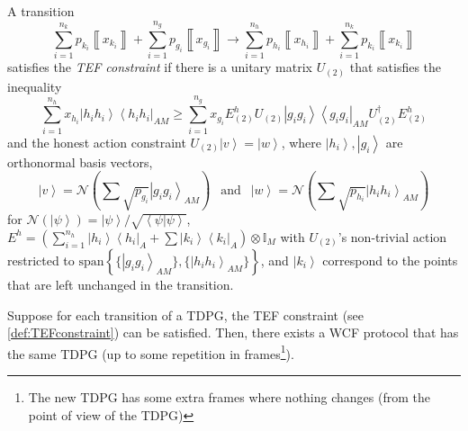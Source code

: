 \documentclass{theoretics}
\begin{document}
%

\begin{definition}\label{def:TEFconstraint} A transition
  \begin{equation}
    \sum_{i=1}^{n_{k}}p_{k_{i}}\left\llbracket x_{k_{i}}\right\rrbracket +\sum_{i=1}^{n_{g}}p_{g_{i}}\left\llbracket x_{g_{i}}\right\rrbracket \to\sum_{i=1}^{n_{h}}p_{h_{i}}\left\llbracket x_{h_{i}}\right\rrbracket +\sum_{i=1}^{n_{k}}p_{k_{i}}\left\llbracket x_{k_{i}}\right\rrbracket \label{eq:transitionForTEF}
  \end{equation}
  satisfies the \emph{TEF constraint} if there is a unitary matrix $U_{(2)}$ that satisfies the inequality
  \begin{equation}
    \sum_{i=1}^{n_{h}}x_{h_{i}}\left|h_{i}h_{i}\right\rangle \left\langle h_{i}h_{i}\right|_{AM}\ge\sum_{i=1}^{n_{g}}x_{g_{i}}E_{(2)}^{h}U_{(2)}\left|g_{i}g_{i}\right\rangle \left\langle g_{i}g_{i}\right|_{AM}U^\dagger_{(2)}E_{(2)}^{h}\label{eq:ProtocolConstraintEquation}
  \end{equation}
  and the honest action constraint
  $
    U_{(2)}\left|v\right\rangle =\left|w\right\rangle
  $,
  where ${{\left|h_{i}\right\rangle},{\left|g_{i}\right\rangle}}$
  are orthonormal basis vectors,
  \begin{displaymath}
    \left|v\right\rangle =\mathcal{N}\left(\sum\sqrt{p_{g_{i}}}\left|g_{i}g_{i}\right\rangle _{AM}\right)\ \
    \text{ and }\ \
    \left|w\right\rangle =\mathcal{N}\left(\sum\sqrt{p_{h_{i}}}\left|h_{i}h_{i}\right\rangle _{AM}\right)
  \end{displaymath}
  for $\mathcal{N}(\left|\psi\right\rangle )=\left|\psi\right\rangle /\sqrt{\left\langle \psi|\psi\right\rangle }$,
  $E^{h}=\left(\sum_{i=1}^{n_{h}}\left|h_{i}\right\rangle \left\langle h_{i}\right|_{A}+\sum\left|k_{i}\right\rangle \left\langle k_{i}\right|_{A}\right)\otimes\mathbb{I}_{M}$
  with $U_{(2)}$'s non-trivial action restricted to $\text{span}\left\{ \{\left|g_{i}g_{i}\right\rangle _{AM}\},\{\left|h_{i}h_{i}\right\rangle _{AM}\}\right\} $,
  and $\left|k_{i}\right\rangle $ correspond to the points that
  are left unchanged in the transition.

\end{definition}


\begin{theorem}\label{thm:TEFconstraint} Suppose for each transition of a TDPG, the TEF constraint (see \cref{def:TEFconstraint}) can be satisfied. Then, there exists a WCF protocol that has the same TDPG (up to some repetition in frames\footnote{The new TDPG has some extra frames where nothing changes (from the point of view of the TDPG)}).
\end{theorem}
\end{document}
